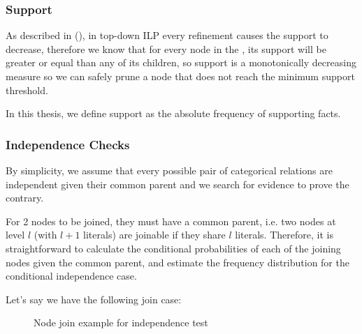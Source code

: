 \subsubsection{Support}

As described in (\cite{LavracDz94}), in top-down ILP every refinement causes the support to decrease, therefore we know
that for every node in the \graphname, its support will be greater or equal than any of its children, so support is a
monotonically decreasing measure so we can safely prune a node that does not reach the minimum support threshold.

In this thesis, we define support as the absolute frequency of supporting facts.


\subsubsection{Independence Checks}

By simplicity, we assume that every possible pair of categorical relations are independent given their common parent and
we search for evidence to prove the contrary.

For 2 nodes to be joined, they must have a common parent, i.e. two nodes at level $l$ (with $l+1$ literals) are joinable
if they share $l$ literals. Therefore, it is straightforward to calculate the conditional probabilities of each of the
joining nodes given the common parent, and estimate the frequency distribution for the conditional independence case.

Let's say we have the following join case:
 
\begin{figure}[!h]
  \caption{Node join example for independence test}
  \centering
  \label{fig:joinIndepExample}
\end{figure}

